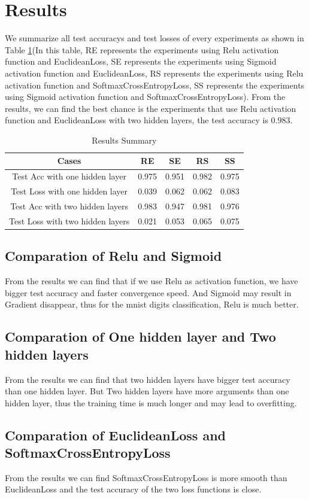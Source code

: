 \documentclass{elegantbook}
\begin{document}
\section{Results}
We summarize all test accuracys and test losses of every experiments as shown in Table \ref{tab3}(In this table, RE represents the experiments using Relu activation function and EuclideanLoss, SE represents the experiments using Sigmoid activation function and EuclideanLoss, RS represents the experiments using Relu activation function and SoftmaxCrossEntropyLoss, SS represents the experiments using Sigmoid activation function and SoftmaxCrossEntropyLoss). From the results, we can find the best chance is the experiments that use Relu activation function and EuclideanLoss with two hidden layers, the test accuracy is $0.983$.

\begin{table}[!ht]
	\centering
	\caption{\label{tab3}Results Summary}
	\begin{tabular}{|c|c|c|c|c|}
		\hline
		Cases & RE & SE & RS & SS \\
		\hline
		Test Acc with one hidden layer & 0.975 & 0.951 & 0.982 & 0.975 \\
		\hline
		Test Loss with one hidden layer & 0.039 & 0.062 & 0.062 & 0.083 \\
		\hline
		Test Acc with two hidden layers & {\color{red} 0.983} & 0.947 & 0.981 & 0.976 \\
		\hline
		Test Loss with two hidden layers & {\color{green} 0.021} & 0.053 & 0.065 & 0.075 \\
		\hline
	\end{tabular}
\end{table}

\subsection{Comparation of Relu and Sigmoid}
From the results we can find that if we use Relu as activation function, we have bigger test accuracy and faster convergence speed. And Sigmoid may result in Gradient disappear, thus for the mnist digits classification, Relu is much better. 

\subsection{Comparation of One hidden layer and Two hidden layers}
From the results we can find that two hidden layers have bigger test accuracy than one hidden layer. But Two hidden layers have more arguments than one hidden layer, thus the training time is much longer and may lead to overfitting.

\subsection{Comparation of EuclideanLoss and SoftmaxCrossEntropyLoss}
From the results we can find SoftmaxCrossEntropyLoss is more smooth than EuclideanLoss and the test accuracy of the two loss functions is close.
\end{document}
